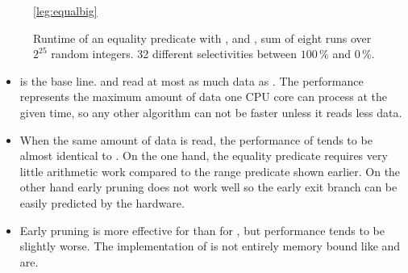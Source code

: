 \begin{figure}[h]
\begin{center}

\ref*{leg:equalbig}
\end{center}
\caption{Runtime of an equality predicate with \simdscan{}, \bwv{} and \bs{},
sum of eight runs over $2^{25}$ random integers. 32 different selectivities
between $100\,\%$ and $0\,\%$.}
\label{fig:eval:equalbig}
\end{figure}

\begin{itemize}
  \item \simdscan{} is the base line. \bwv{} and \bs{} read at most as much data
    as \simdscan{}. The performance represents the maximum amount of data one
    CPU core can process at the given time, so any other algorithm can not be
    faster unless it reads less data.
  \item When the same amount of data is read, the performance of \bwv{} tends to
    be almost identical to \simdscan{}. On the one hand, the equality predicate
    requires very little arithmetic work compared to the range predicate shown
    earlier. On the other hand early pruning does not work well so the early exit
    branch can be easily predicted by the hardware.
  \item Early pruning is more effective for \bs{} than for \bwv{}, but
    performance tends to be slightly worse. The implementation of \bs{} is not
    entirely memory bound like \simdscan{} and \bwv{} are.
\end{itemize}


